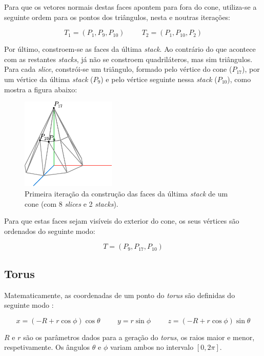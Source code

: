 \documentclass[12pt, a4paper]{article}
\begin{document}
Para que os vetores normais destas faces apontem para fora do cone, utiliza-se a seguinte ordem para
os pontos dos triângulos, nesta e noutras iterações:

$$
T_1 = (P_1, P_9, P_{10})
\hspace{1cm}
T_2 = (P_1, P_{10}, P_2)
$$

Por último, constroem-se as faces da última \emph{stack}. Ao contrário do que acontece com as
restantes \emph{stacks}, já não se constroem quadriláteros, mas sim triângulos. Para cada
\emph{slice}, constrói-se um triângulo, formado pelo vértice do cone ($P_{17}$), por um vértice da
última \emph{stack} ($P_9$) e pelo vértice seguinte nessa \emph{stack} ($P_{10}$), como mostra a
figura abaixo:

\begin{figure}[H]
    \centering
    \includegraphics[width=0.4\textwidth]{res/figures/Cone5.pdf}
    \caption{
        \onehalfspacing
        Primeira iteração da construção das faces da última \emph{stack} de um cone (com 8
        \emph{slices} e 2 \emph{stacks}).
    }
\end{figure}

Para que estas faces sejam visíveis do exterior do cone, os seus vértices são ordenados do seguinte
modo:

$$
T = (P_9, P_{17}, P_{10})
$$

\subsection{Torus}

Matematicamente, as coordenadas de um ponto do \emph{torus} são definidas do seguinte modo
\cite{torus}:

$$
x = (-R + r \cos \phi) \cos \theta
\hspace{1cm}
y = r \sin \phi
\hspace{1cm}
z = (-R + r \cos \phi) \sin \theta
$$

$R$ e $r$ são os parâmetros dados para a geração do \emph{torus}, os raios maior e menor,
respetivamente. Os ângulos $\theta$ e $\phi$ variam ambos no intervalo $[0, 2\pi]$.
\end{document}
